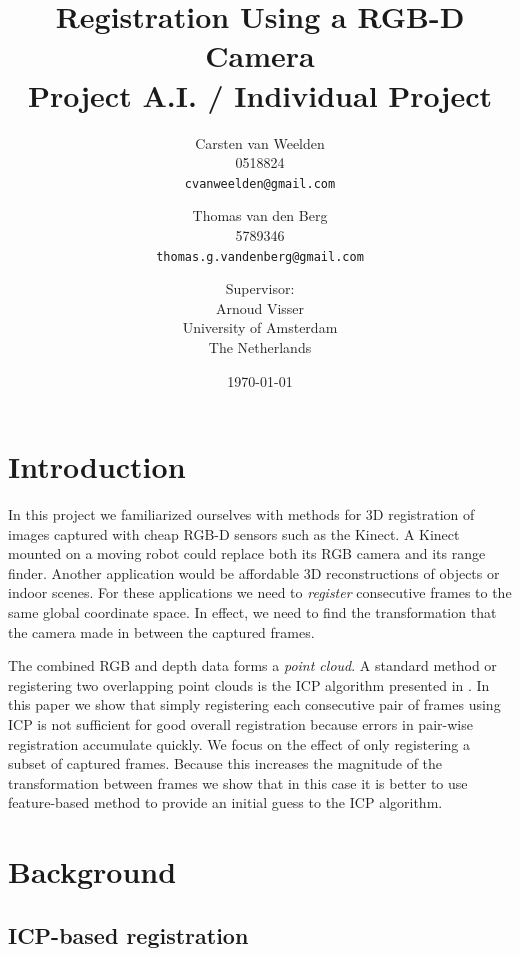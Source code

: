 \documentclass[a4paper]{article}
\title{Registration Using a RGB-D Camera\\
{\large Project A.I. / Individual Project}}
\author{Carsten van Weelden \\ 0518824 \\ \texttt{cvanweelden@gmail.com} \and Thomas van den Berg \\ 5789346 \\ \texttt{thomas.g.vandenberg@gmail.com} \and
 \small{Supervisor:} \\ Arnoud Visser \\ University of Amsterdam\\
  The Netherlands}
\date{\today}
\begin{document}
\maketitle

\section{Introduction}

In this project we familiarized ourselves with methods for 3D registration of images captured with cheap RGB-D sensors such as the Kinect. A Kinect mounted on a moving robot could replace both its RGB camera and its range finder. Another application would be affordable 3D reconstructions of objects or indoor scenes. For these applications we need to \emph{register} consecutive frames to the same global coordinate space. In effect, we need to find the transformation that the camera made in between the captured frames. %



The combined RGB and depth data forms a \emph{point cloud}. A standard method or registering two overlapping point clouds is the \ac{ICP} algorithm presented in \cite{besl1992method}. In this paper we show that simply registering each consecutive pair of frames using \ac{ICP} is not sufficient for good overall registration because errors in pair-wise registration accumulate quickly. We focus on the effect of only registering a subset of captured frames. Because this increases the magnitude of the transformation between frames we show that in this case it is better to use feature-based method to provide an initial guess to the \ac{ICP} algorithm.

\section{Background}

\subsection{ICP-based registration}
\end{document}
